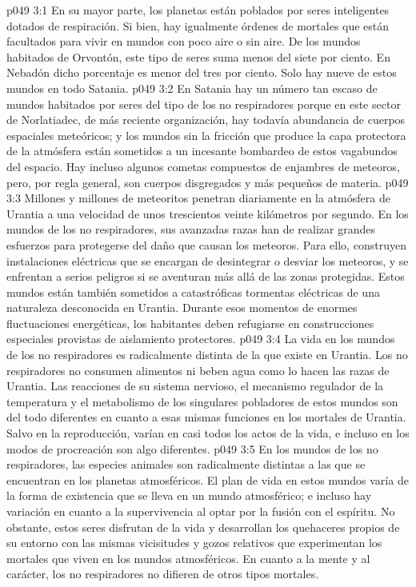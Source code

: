\vs p049 3:1 En su mayor parte, los planetas están poblados por seres inteligentes dotados de respiración. Si bien, hay igualmente órdenes de mortales que están facultados para vivir en mundos con poco aire o sin aire. De los mundos habitados de Orvontón, este tipo de seres suma menos del siete por ciento. En Nebadón dicho porcentaje es menor del tres por ciento. Solo hay nueve de estos mundos en todo Satania.
\vs p049 3:2 En Satania hay un número tan escaso de mundos habitados por seres del tipo de los no respiradores porque en este sector de Norlatiadec, de más reciente organización, hay todavía abundancia de cuerpos espaciales meteóricos; y los mundos sin la fricción que produce la capa protectora de la atmósfera están sometidos a un incesante bombardeo de estos vagabundos del espacio. Hay incluso algunos cometas compuestos de enjambres de meteoros, pero, por regla general, son cuerpos disgregados y más pequeños de materia.
\vs p049 3:3 Millones y millones de meteoritos penetran diariamente en la atmósfera de Urantia a una velocidad de unos trescientos veinte kilómetros por segundo. En los mundos de los no respiradores, sus avanzadas razas han de realizar grandes esfuerzos para protegerse del daño que causan los meteoros. Para ello, construyen instalaciones eléctricas que se encargan de desintegrar o desviar los meteoros, y se enfrentan a serios peligros si se aventuran más allá de las zonas protegidas. Estos mundos están también sometidos a catastróficas tormentas eléctricas de una naturaleza desconocida en Urantia. Durante esos momentos de enormes fluctuaciones energéticas, los habitantes deben refugiarse en construcciones especiales provistas de aislamiento protectores.
\vs p049 3:4 La vida en los mundos de los no respiradores es radicalmente distinta de la que existe en Urantia. Los no respiradores no consumen alimentos ni beben agua como lo hacen las razas de Urantia. Las reacciones de su sistema nervioso, el mecanismo regulador de la temperatura y el metabolismo de los singulares pobladores de estos mundos son del todo diferentes en cuanto a esas mismas funciones en los mortales de Urantia. Salvo en la reproducción, varían en casi todos los actos de la vida, e incluso en los modos de procreación son algo diferentes.
\vs p049 3:5 En los mundos de los no respiradores, las especies animales son radicalmente distintas a las que se encuentran en los planetas atmosféricos. El plan de vida en estos mundos varía de la forma de existencia que se lleva en un mundo atmosférico; e incluso hay variación en cuanto a la supervivencia al optar por la fusión con el espíritu. No obstante, estos seres disfrutan de la vida y desarrollan los quehaceres propios de su entorno con las mismas vicisitudes y gozos relativos que experimentan los mortales que viven en los mundos atmosféricos. En cuanto a la mente y al carácter, los no respiradores no difieren de otros tipos mortales.
